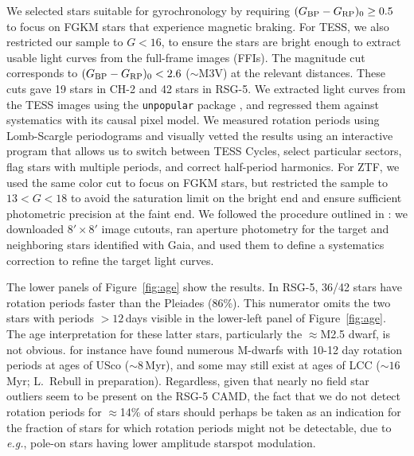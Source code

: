 \documentclass[12pt,twocolumn,linenumbers]{aastex63}
\newcommand{\bpmrpo}{(G_{\rm BP}-G_{\rm RP})_0}
\begin{document}
We selected stars suitable for gyrochronology by requiring $\bpmrpo
\geq 0.5$ to focus on FGKM stars that experience magnetic braking.
For TESS, we also restricted our sample to $G<16$, to ensure the stars
are bright enough to extract usable light curves from the full-frame
images (FFIs).  The magnitude cut corresponds to $\bpmrpo < 2.6$
($\sim$M3V) at the relevant distances.  These cuts gave 19 stars in
CH-2 and 42 stars in RSG-5.  We extracted light curves from the TESS
images using the \texttt{unpopular} package
\citep{hattorio_2021_cpm}, and regressed them against systematics with
its causal pixel model.  We measured rotation periods using
Lomb-Scargle periodograms and visually vetted the results using an
interactive program that allows us to switch between TESS Cycles,
select particular sectors, flag stars with multiple periods, and
correct half-period harmonics. For ZTF, we used the same color cut to
focus on FGKM stars, but restricted the sample to $13 < G < 18$ to
avoid the saturation limit on the bright end and ensure sufficient
photometric precision at the faint end. We followed the procedure
outlined in \citet{curtis_rup147_2020}: we downloaded $8'\times8'$
image cutouts, ran aperture photometry for the target and neighboring
stars identified with Gaia, and used them to define a systematics
correction to refine the target light curves. 


The lower panels of Figure~\ref{fig:age} show the results.  In RSG-5,
36/42 stars have rotation periods faster than the Pleiades (86\%).
This numerator omits the two stars with periods $>$$12$\,days visible in
the lower-left panel of Figure~\ref{fig:age}.  The age interpretation
for these latter stars, particularly the $\approx$M2.5 dwarf, is not
obvious.  \citet{rebull_usco_2018} for instance have found numerous
M-dwarfs with 10-12 day rotation periods at ages of USco ($\sim$$8$\,Myr),
and some may still exist at ages of LCC ($\sim$$16$\,Myr;
L.~Rebull in preparation).  Regardless, given that nearly no field
star outliers seem to be present on the RSG-5 CAMD, the fact that we
do not detect rotation periods for $\approx$14\% of stars should
perhaps be taken as an indication for the fraction of stars for
which rotation periods might not be detectable, due to {\it e.g.}, pole-on
stars having lower amplitude starspot modulation.
\end{document}
